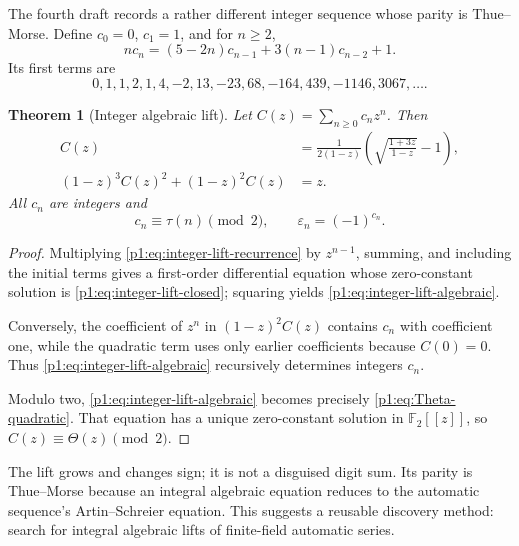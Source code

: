\documentclass[11pt,oneside]{article}
\numberwithin{equation}{section}
\newtheorem{theorem}{Theorem}[section]
\theoremstyle{definition}
\theoremstyle{remark}
\newcommand{\Ftwo}{\mathbb F_2}
\newcommand{\eps}{\varepsilon}
\begin{document}
The fourth draft records a rather different integer sequence whose parity is
Thue--Morse.  Define \(c_0=0\), \(c_1=1\), and for \(n\ge2\),
\begin{equation}
  nc_n=(5-2n)c_{n-1}+3(n-1)c_{n-2}+1.
  \label{p1:eq:integer-lift-recurrence}
\end{equation}
Its first terms are
\[
 0,1,1,2,1,4,-2,13,-23,68,-164,439,-1146,3067,\ldots .
\]

\begin{theorem}[Integer algebraic lift]
\label{p1:thm:integer-lift}
Let \(C(z)=\sum_{n\ge0}c_nz^n\).  Then
\begin{align}
  C(z)&=\frac{1}{2(1-z)}
   \left(\sqrt{\frac{1+3z}{1-z}}-1\right),
  \label{p1:eq:integer-lift-closed}\\
  (1-z)^3C(z)^2+(1-z)^2C(z)&=z.
  \label{p1:eq:integer-lift-algebraic}
\end{align}
All \(c_n\) are integers and
\begin{equation}
  \boxed{
  c_n\equiv\tau(n)\pmod2,
  \qquad
  \eps_n=(-1)^{c_n}.}
  \label{p1:eq:integer-lift-parity}
\end{equation}
\end{theorem}

\begin{proof}
Multiplying \eqref{p1:eq:integer-lift-recurrence} by \(z^{n-1}\), summing, and
including the initial terms gives a first-order differential equation whose
zero-constant solution is \eqref{p1:eq:integer-lift-closed}; squaring yields
\eqref{p1:eq:integer-lift-algebraic}.

Conversely, the coefficient of \(z^n\) in \((1-z)^2C(z)\) contains \(c_n\)
with coefficient one, while the quadratic term uses only earlier coefficients
because \(C(0)=0\).  Thus \eqref{p1:eq:integer-lift-algebraic} recursively
determines integers \(c_n\).

Modulo two, \eqref{p1:eq:integer-lift-algebraic} becomes precisely
\eqref{p1:eq:Theta-quadratic}.  That equation has a unique zero-constant solution
in \(\Ftwo[[z]]\), so \(C(z)\equiv\Theta(z)\pmod2\).
\end{proof}

\begin{remark}
The lift grows and changes sign; it is not a disguised digit sum.  Its parity
is Thue--Morse because an integral algebraic equation reduces to the automatic
sequence's Artin--Schreier equation.  This suggests a reusable discovery
method: search for integral algebraic lifts of finite-field automatic series.
\end{remark}
\end{document}
